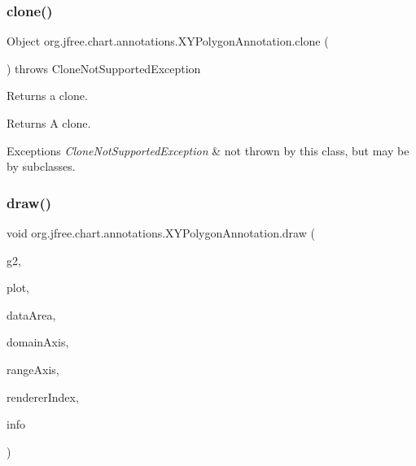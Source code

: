 \subsubsection{\texorpdfstring{clone()}{clone()}}
{\footnotesize\ttfamily Object org.\+jfree.\+chart.\+annotations.\+X\+Y\+Polygon\+Annotation.\+clone (\begin{DoxyParamCaption}{ }\end{DoxyParamCaption}) throws Clone\+Not\+Supported\+Exception}

Returns a clone.

\begin{DoxyReturn}{Returns}
A clone.
\end{DoxyReturn}

\begin{DoxyExceptions}{Exceptions}
{\em Clone\+Not\+Supported\+Exception} & not thrown by this class, but may be by subclasses. \\
\hline
\end{DoxyExceptions}
\mbox{\label{classorg_1_1jfree_1_1chart_1_1annotations_1_1_x_y_polygon_annotation_a5401820a121a775d9477757517bab975}} 
\subsubsection{\texorpdfstring{draw()}{draw()}}
{\footnotesize\ttfamily void org.\+jfree.\+chart.\+annotations.\+X\+Y\+Polygon\+Annotation.\+draw (\begin{DoxyParamCaption}\item[{Graphics2D}]{g2,  }\item[{\mbox{\hyperlink{classorg_1_1jfree_1_1chart_1_1plot_1_1_x_y_plot}{X\+Y\+Plot}}}]{plot,  }\item[{Rectangle2D}]{data\+Area,  }\item[{\mbox{\hyperlink{classorg_1_1jfree_1_1chart_1_1axis_1_1_value_axis}{Value\+Axis}}}]{domain\+Axis,  }\item[{\mbox{\hyperlink{classorg_1_1jfree_1_1chart_1_1axis_1_1_value_axis}{Value\+Axis}}}]{range\+Axis,  }\item[{int}]{renderer\+Index,  }\item[{\mbox{\hyperlink{classorg_1_1jfree_1_1chart_1_1plot_1_1_plot_rendering_info}{Plot\+Rendering\+Info}}}]{info }\end{DoxyParamCaption})}

